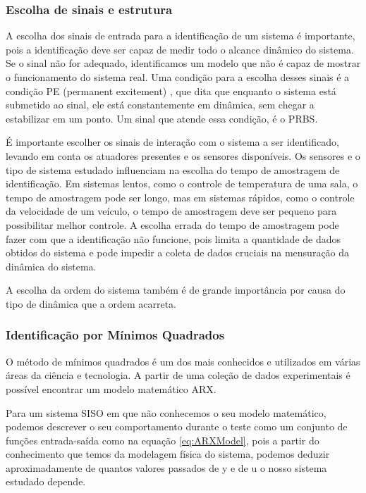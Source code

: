 \subsubsection{Escolha de sinais e estrutura}

A escolha dos sinais de entrada para a identificação de um sistema é importante, pois a identificação deve ser capaz de medir todo o alcance dinâmico do sistema. Se o sinal não for adequado, identificamos um modelo que não é capaz de mostrar o funcionamento do sistema real. Uma condição para a escolha desses sinais é a condição PE (permanent excitement) \cite{katayama2005}, que dita que enquanto o sistema está submetido ao sinal, ele está constantemente em dinâmica, sem chegar a estabilizar em um ponto. Um sinal que atende essa condição, é o PRBS.


É importante escolher os sinais de interação com o sistema a ser identificado, levando em conta os atuadores presentes e os sensores disponíveis. Os sensores e o tipo de sistema estudado influenciam na escolha do tempo de amostragem de identificação. Em sistemas lentos, como o controle de temperatura de uma sala, o tempo de amostragem pode ser longo, mas em sistemas rápidos, como o controle da velocidade de um veículo, o tempo de amostragem deve ser pequeno para possibilitar melhor controle. A escolha errada do tempo de amostragem pode fazer com que a identificação não funcione, pois limita a quantidade de dados obtidos do sistema e pode impedir a coleta de dados cruciais na mensuração da dinâmica do sistema.


A escolha da ordem do sistema também é de grande importância por causa do tipo de dinâmica que a ordem acarreta.

\subsubsection{Identificação por Mínimos Quadrados}
O método de mínimos quadrados é um dos mais conhecidos e utilizados em várias áreas da ciência e tecnologia. A partir de uma coleção de dados experimentais é possível encontrar um modelo matemático ARX.


Para um sistema SISO em que não conhecemos o seu modelo matemático, podemos descrever o seu comportamento durante o teste como um conjunto de funções entrada-saída como na equação \eqref{eq:ARXModel}, pois a partir do conhecimento que temos da modelagem física do sistema, podemos deduzir aproximadamente de quantos valores passados de y e de u o nosso sistema estudado depende.


